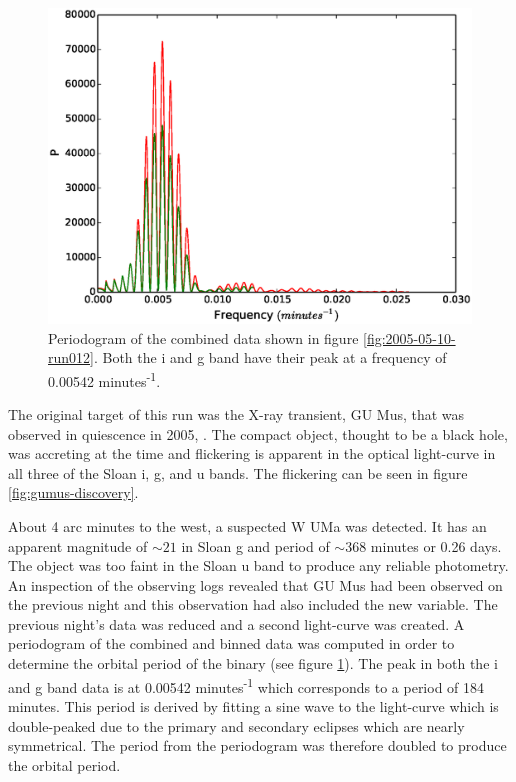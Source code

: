  \begin{figure}
     \center
     \includegraphics[width=120mm]{images/2005-05-10-pgram-bin16.eps} 
     \caption{Periodogram of the combined data shown in figure \ref{fig:2005-05-10-run012}. Both the i and g band have their peak at a frequency of 0.00542 minutes\textsuperscript{-1}.}
     \label{fig:2005-05-10-pgram}
   \end{figure}

  
The original target of this run was the X-ray transient, {GU Mus}, that was observed in quiescence in 2005, \citep{tariq2010}. The compact object, thought to be a black hole, was accreting at the time and flickering is apparent in the optical light-curve in all three of the Sloan i, g, and u bands. The flickering can be seen in figure \ref{fig:gumus-discovery}. 

About 4 arc minutes to the west, a suspected {W UMa} was detected. It has an apparent magnitude of $\sim21$ in Sloan g and period of $\sim 368$ minutes or 0.26 days. The object was too faint in the Sloan u band to produce any reliable photometry. An inspection of the observing logs revealed that GU Mus had been observed on the previous night and this observation had also included the new variable. The previous night's data was reduced and a second light-curve was created. A periodogram of the combined and binned data  was computed in order to determine the orbital period of the binary (see figure \ref{fig:2005-05-10-pgram}). The peak in both the i and g band data is at 0.00542 minutes\textsuperscript{-1} which corresponds to a period of 184 minutes. This period is derived by fitting a sine wave to the light-curve which is double-peaked due to the primary and secondary eclipses which are nearly symmetrical. The period from the periodogram was therefore doubled to produce the orbital period. 


